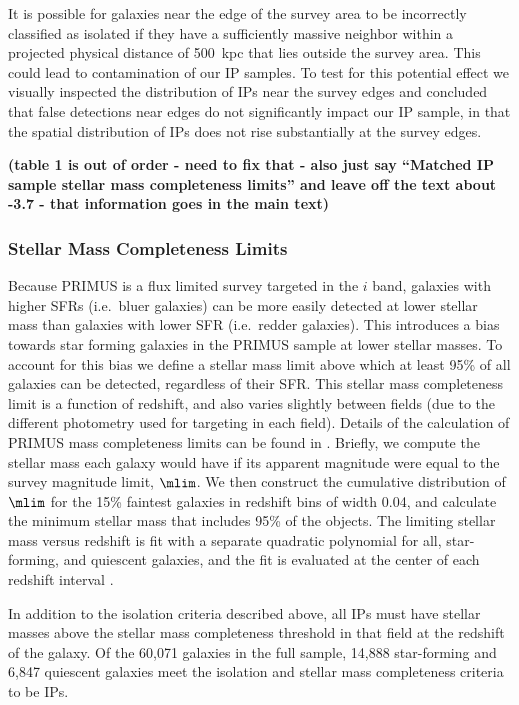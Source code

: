 It is possible for galaxies near the edge of the survey area to be incorrectly classified as isolated if they have a sufficiently massive neighbor within a projected physical distance of 500~kpc that lies outside the survey area.
This could lead to contamination of our IP samples.
To test for this potential effect we visually inspected the distribution of IPs near the survey edges and concluded that false detections near edges do not significantly impact our IP sample, in that the spatial distribution of IPs does not rise substantially at the survey edges. 


{\bf(table 1 is out of order - need to fix that - also just say ``Matched IP sample stellar mass completeness limits'' and leave off the text about -3.7 - that information goes in the main text)}

\subsubsection{Stellar Mass Completeness Limits}\label{sec:mass_limit}

Because PRIMUS is a flux limited survey targeted in the $i$ band, galaxies with higher SFRs (i.e.~bluer galaxies) can be more easily detected at lower stellar mass than galaxies with lower SFR (i.e.~redder galaxies).
This introduces a bias towards star forming galaxies in the PRIMUS sample at lower stellar masses.
To account for this bias we define a stellar mass limit above which at least 95\% of all galaxies can be detected, regardless of their SFR.
This stellar mass completeness limit is a function of redshift, and also varies slightly between fields (due to the different photometry used for targeting in each field).
Details of the calculation of PRIMUS mass completeness limits can be found in \citet{Moustakas13}.
Briefly, we compute the stellar mass each galaxy would have if its apparent magnitude were equal to the survey magnitude limit, $\mlim$.  We then construct the cumulative distribution of $\mlim$ for the 15\% faintest galaxies in redshift bins of width 0.04, and calculate the minimum stellar mass that includes 95\% of the objects.  The limiting stellar mass versus redshift is fit with a separate quadratic polynomial for all, star-forming, and quiescent galaxies, and the fit is evaluated at the center of each redshift interval \citep[see][]{Moustakas13}.

In addition to the isolation criteria described above, all IPs must have stellar masses above the stellar mass completeness threshold in that field at the redshift of the galaxy. 
Of the 60,071 galaxies in the full sample, 14,888 star-forming and 6,847 quiescent galaxies meet the isolation and stellar mass completeness criteria to be IPs.


